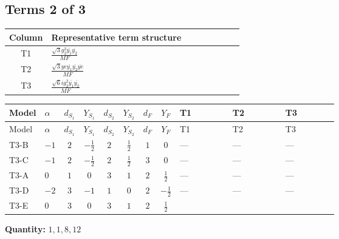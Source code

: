 \documentclass[8pt]{article}
\begin{document}
\begin{landscape}
\subsection*{Terms 2 of 3}
\begin{center}
\begin{tabular}{@{}c >{\raggedright\arraybackslash}p{0.82\linewidth}@{}}
\toprule
Column & Representative term structure \\
\midrule
T1 & \(\displaystyle \frac{\sqrt{3} g_{2}^{2} \overline{y_{1}} \overline{y_{2}}}{MF}\) \\
\midrule
T2 & \(\displaystyle \frac{\sqrt{3} ye \overline{y_{1}} \overline{y_{2}} \overline{ye}}{MF}\) \\
\midrule
T3 & \(\displaystyle \frac{\sqrt{6} i g_{2}^{2} \overline{y_{1}} \overline{y_{2}}}{MF}\) \\
\midrule
\bottomrule
\end{tabular}
\end{center}
\smallskip
\tiny
\begin{longtable}{@{}llcccccc >{\raggedright\arraybackslash}p{0.21\linewidth} >{\raggedright\arraybackslash}p{0.21\linewidth} >{\raggedright\arraybackslash}p{0.21\linewidth}@{}}
\toprule
Model & $\alpha$ & $d_{S_1}$ & $Y_{S_1}$ & $d_{S_2}$ & $Y_{S_2}$ & $d_F$ & $Y_F$ & T1 & T2 & T3 \\
\midrule
\endfirsthead
\toprule
Model & $\alpha$ & $d_{S_1}$ & $Y_{S_1}$ & $d_{S_2}$ & $Y_{S_2}$ & $d_F$ & $Y_F$ & T1 & T2 & T3 \\
\midrule
\endhead
T3-B & $-1$ & $2$ & $-\frac{1}{2}$ & $2$ & $\frac{1}{2}$ & $1$ & $0$ & --- & --- & --- \\
\midrule
T3-C & $-1$ & $2$ & $-\frac{1}{2}$ & $2$ & $\frac{1}{2}$ & $3$ & $0$ & --- & --- & --- \\
\midrule
T3-A & $0$ & $1$ & $0$ & $3$ & $1$ & $2$ & $\frac{1}{2}$ & --- & --- & --- \\
\midrule
T3-D & $-2$ & $3$ & $-1$ & $1$ & $0$ & $2$ & $-\frac{1}{2}$ & --- & --- & --- \\
\midrule
T3-E & $0$ & $3$ & $0$ & $3$ & $1$ & $2$ & $\frac{1}{2}$ & \scriptsize\adjustbox{max width=\linewidth}{$\begin{gathered} \frac{49 \sqrt{3} g_{2}^{2} \overline{y_{1}} \overline{y_{2}}}{24 MF}\end{gathered}$} & \scriptsize\adjustbox{max width=\linewidth}{$\begin{gathered} - \frac{\sqrt{3} ye \overline{y_{1}} \overline{y_{2}} \overline{ye}}{12 MF}\end{gathered}$} & \scriptsize\adjustbox{max width=\linewidth}{$\begin{gathered} \frac{\sqrt{6} i g_{2}^{2} \overline{y_{1}} \overline{y_{2}}}{3 MF}\end{gathered}$} \\
\midrule
\bottomrule
\end{longtable}
\clearpage
\noindent\textbf{Quantity: }$\mathrm{1,1,8,12}$\par\smallskip

\end{landscape}
\end{document}
